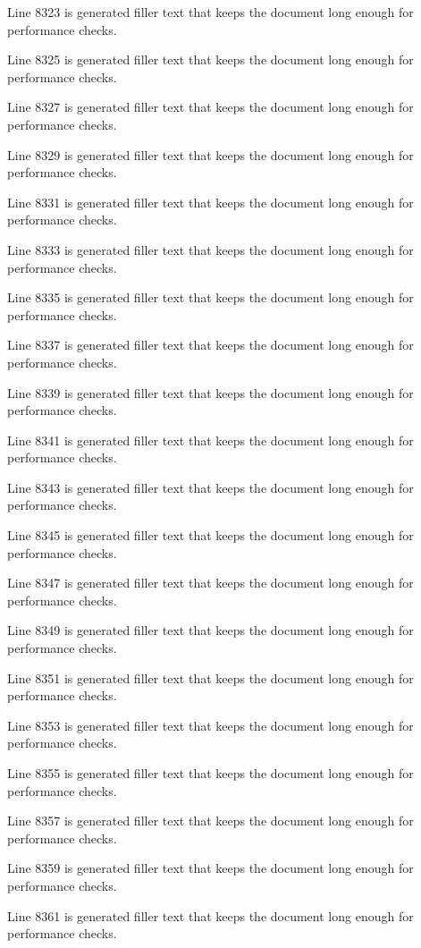 Line 8323 is generated filler text that keeps the document long enough for performance checks.

Line 8325 is generated filler text that keeps the document long enough for performance checks.

Line 8327 is generated filler text that keeps the document long enough for performance checks.

Line 8329 is generated filler text that keeps the document long enough for performance checks.

Line 8331 is generated filler text that keeps the document long enough for performance checks.

Line 8333 is generated filler text that keeps the document long enough for performance checks.

Line 8335 is generated filler text that keeps the document long enough for performance checks.

Line 8337 is generated filler text that keeps the document long enough for performance checks.

Line 8339 is generated filler text that keeps the document long enough for performance checks.

Line 8341 is generated filler text that keeps the document long enough for performance checks.

Line 8343 is generated filler text that keeps the document long enough for performance checks.

Line 8345 is generated filler text that keeps the document long enough for performance checks.

Line 8347 is generated filler text that keeps the document long enough for performance checks.

Line 8349 is generated filler text that keeps the document long enough for performance checks.

Line 8351 is generated filler text that keeps the document long enough for performance checks.

Line 8353 is generated filler text that keeps the document long enough for performance checks.

Line 8355 is generated filler text that keeps the document long enough for performance checks.

Line 8357 is generated filler text that keeps the document long enough for performance checks.

Line 8359 is generated filler text that keeps the document long enough for performance checks.

Line 8361 is generated filler text that keeps the document long enough for performance checks.

